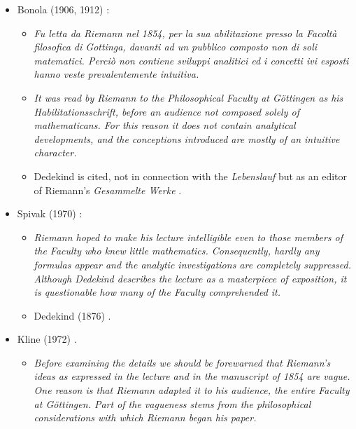 \documentclass[12pt]{article}
\begin{document}
\begin{itemize}

\item[$\bullet$]Bonola (1906, 1912) \cite{Bonola1906}:

\begin{itemize}

\item[]{\it Fu letta da Riemann nel 1854, per la sua abilitazione presso la Facolt\`a filosofica di Gottinga, davanti ad un pubblico composto non di soli matematici. Perci\`o non contiene sviluppi analitici ed i concetti ivi esposti hanno veste prevalentemente intuitiva.}

\item[]{\it It was read by Riemann to the Philosophical Faculty at G\"ottingen as his Habilitationsschrift, before an audience not composed solely of mathematicans. For this reason it does not contain analytical developments, and the conceptions introduced are mostly of an intuitive character.}

\item[$\bullet$]Dedekind is cited, not in connection with the {\it Lebenslauf} but as an editor of Riemann's {\it Gesammelte Werke} \cite{Dedekind1876b}.

\end{itemize}

\item[$\bullet$]Spivak (1970) \cite{Spivak1970}:

\begin{itemize}

\item[]{\it Riemann hoped to make his lecture intelligible even to those members of the Faculty who knew little mathematics. Consequently, hardly any formulas appear and the analytic investigations are completely suppressed. Although Dedekind describes the lecture as a masterpiece of exposition, it is questionable how many of the Faculty comprehended it.}

\item[$\bullet$]Dedekind (1876) \cite{Dedekind1876b}.

\end{itemize}

\item[$\bullet$]Kline (1972) \cite{Kline1972}.

\begin{itemize}

\item[]{\it Before examining the details we should be forewarned that Riemann's ideas as expressed in the lecture and in the manuscript of 1854 are vague. One reason is that Riemann adapted it to his audience, the entire Faculty at G\"ottingen. Part of the vagueness stems from the philosophical considerations with which Riemann began his paper.}


\end{itemize}
\end{itemize}
\end{document}
